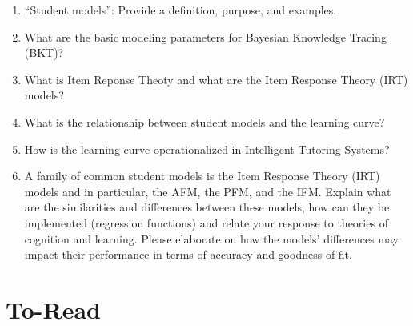 \documentclass[
]{book}
\providecommand{\tightlist}{%
  \setlength{\itemsep}{0pt}\setlength{\parskip}{0pt}}
\begin{document}
\begin{enumerate}
\def\labelenumi{\arabic{enumi}.}
\tightlist
\item
  ``Student models'': Provide a definition, purpose, and examples.
\item
  What are the basic modeling parameters for Bayesian Knowledge Tracing (BKT)?
\item
  What is Item Reponse Theoty and what are the Item Response Theory (IRT) models?
\item
  What is the relationship between student models and the learning curve?
\item
  How is the learning curve operationalized in Intelligent Tutoring Systems?
\item
  A family of common student models is the Item Response Theory (IRT) models and in particular, the AFM, the PFM, and the IFM. Explain what are the similarities and differences between these models, how can they be implemented (regression functions) and relate your response to theories of cognition and learning. Please elaborate on how the models' differences may impact their performance in terms of accuracy and goodness of fit.
\end{enumerate}

\section{To-Read}\label{to-read-2}
\end{document}
